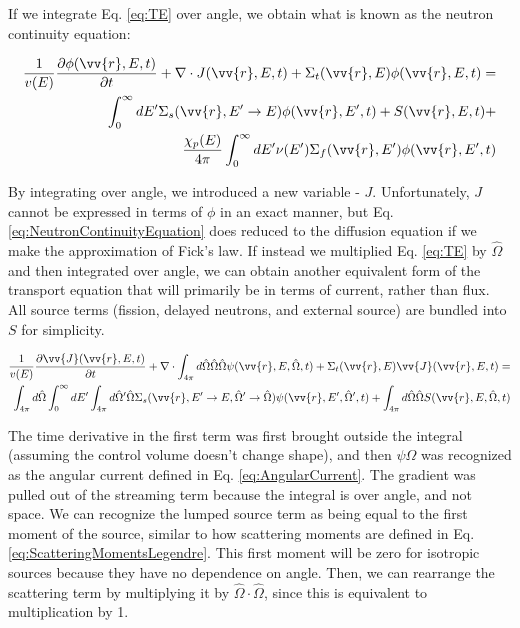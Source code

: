 \documentclass[10pt]{article}
\begin{document}
\begin{flushleft}
 If we integrate Eq. \ref{eq:TE} over angle, we obtain what is known as the neutron continuity equation:

\begin{equation}
\label{eq:NeutronContinuityEquation}
\begin{aligned}
\frac{1}{v(E)} \frac{\partial\phi(\vv{r}, E, t)}{\partial t} +
 \nabla\cdot J(\vv{r}, E, t) + 
 \Sigma_t(\vv{r},E)\phi(\vv{r}, E, t) = \\
 \int_{0}^{\infty}dE' \Sigma_s(\vv{r}, E'\rightarrow E)\phi(\vv{r}, E', t) + S(\vv{r}, E, t)+\\
 \frac{\chi_p(E)}{4\pi} \int_{0}^{\infty} dE'\nu(E')\Sigma_f(\vv{r}, E')\phi(\vv{r}, E',t)
\end{aligned}
\end{equation}

By integrating over angle, we introduced a new variable - \(J\). Unfortunately, \(J\) cannot be expressed in terms of \(\phi\) in an exact manner, but Eq. \ref{eq:NeutronContinuityEquation} does reduced to the diffusion equation if we make the approximation of Fick's law. If instead we multiplied Eq. \ref{eq:TE} by \(\hat{\Omega}\) and then integrated over angle, we can obtain another equivalent form of the transport equation that will primarily be in terms of current, rather than flux. All source terms (fission, delayed neutrons, and external source) are bundled into \(S\) for simplicity. 

\begin{equation}
\label{eq:TEAngleAngleIntegrated}
\begin{aligned}
\frac{1}{v(E)} \frac{\partial\vv{J}(\vv{r}, E, t)}{\partial t} +
 \nabla\cdot \int_{4\pi}^{} d\hat{\Omega}\hat{\Omega}\hat{\Omega}\psi(\vv{r}, E, \hat{\Omega},t) + 
 \Sigma_t(\vv{r},E)\vv{J}(\vv{r}, E, t) = \\
 \int_{4\pi}^{} d\hat{\Omega} \int_{0}^{\infty}dE' \int_{4\pi}^{ } d\hat{\Omega}' \hat{\Omega}\Sigma_s(\vv{r}, E'\rightarrow E, \hat{\Omega}'\rightarrow\hat{\Omega})\psi(\vv{r}, E', \hat{\Omega}',t) + \int_{4\pi}^{} d\hat{\Omega}\hat{\Omega}S(\vv{r}, E, \hat{\Omega}, t)\\
\end{aligned}
\end{equation}

The time derivative in the first term was first brought outside the integral (assuming the control volume doesn't change shape), and then \(\psi\hat{\Omega}\) was recognized as the angular current defined in Eq. \ref{eq:AngularCurrent}. The gradient was pulled out of the streaming term because the integral is over angle, and not space. We can recognize the lumped source term as being equal to the first moment of the source, similar to how scattering moments are defined in Eq. \ref{eq:ScatteringMomentsLegendre}. This first moment will be zero for isotropic sources because they have no dependence on angle. Then, we can rearrange the scattering term by multiplying it by \(\hat{\Omega}\cdot\hat{\Omega}\), since this is equivalent to multiplication by 1.


\end{flushleft}
\end{document}
